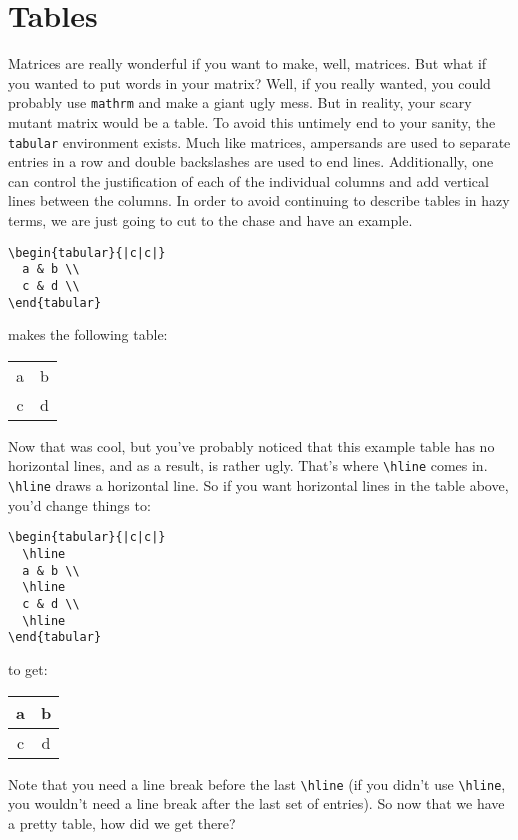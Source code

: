 \chapter{Tables}
\label{cha:tables}

Matrices are really wonderful if you want to make, well, matrices.
But what if you wanted to put words in your matrix?  Well, if you
really wanted, you could probably use \texttt{mathrm} and make a giant
ugly mess.  But in reality, your scary mutant matrix would be a
table.  To avoid this untimely end to your sanity, the
\texttt{tabular} environment exists.  Much like matrices, ampersands
are used to separate entries in a row and double backslashes are used
to end lines.  Additionally, one can control the justification of each
of the individual columns and add vertical lines between the columns.
In order to avoid continuing to describe tables in hazy terms, we are
just going to cut to the chase and have an example.
\begin{verbatim}
\begin{tabular}{|c|c|}
  a & b \\
  c & d \\
\end{tabular}
\end{verbatim}
makes the following table:
\begin{center}
\begin{tabular}{|c|c|}
  a & b \\
  c & d \\
\end{tabular}
\end{center}
Now that was cool, but you've probably noticed that this example table
has no horizontal lines, and as a result, is rather ugly.  That's
where \verb|\hline| comes in.  \verb|\hline| draws a horizontal line.
So if you want horizontal lines in the table above, you'd change
things to:
\begin{verbatim}
\begin{tabular}{|c|c|}
  \hline
  a & b \\
  \hline
  c & d \\
  \hline
\end{tabular}
\end{verbatim}
to get:
\begin{center}
\begin{tabular}{|c|c|}
  \hline
  a & b \\
  \hline
  c & d \\
  \hline
\end{tabular}
\end{center}
Note that you need a line break before the last \verb|\hline| (if you
didn't use \verb|\hline|, you wouldn't need a line break after the
last set of entries).  So now that we have a pretty table, how did we
get there?

